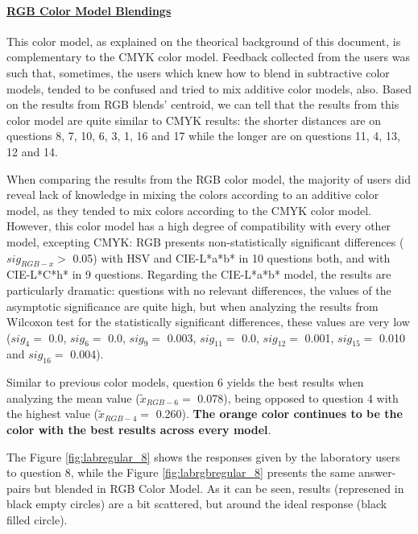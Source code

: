 \paragraph{\ul{RGB Color Model Blendings}} \par
\label{subsubsec:rgbcolormodel}
%
This color model, as explained on the theorical background of this document, is complementary to the CMYK color model. Feedback collected from the users was such that, sometimes, the users which knew how to blend in subtractive color models, tended to be confused and tried to mix additive color models, also.
Based on the results from RGB blends' centroid, we can tell that the results from this color model are quite similar to CMYK results: the shorter distances are on questions 8, 7, 10, 6, 3, 1, 16 and 17 while the longer are on questions 11, 4, 13, 12 and 14. \par
%
When comparing the results from the RGB color model, the majority of users did reveal lack of knowledge in mixing the colors according to an additive color model, as they tended to mix colors according to the CMYK color model. However, this color model has a high degree of compatibility with every other model,
excepting CMYK: RGB presents non-statistically significant differences ($sig_{RGB-x} > $ 0.05) with HSV and CIE-L*a*b* in 10 questions both, and with CIE-L*C*h* in 9 questions. Regarding the CIE-L*a*b* model, the results are particularly dramatic: questions with no relevant differences, the values of the
asymptotic significance are quite high, but when analyzing the results from Wilcoxon test for the statistically significant differences, these values are very low ($sig_{4} = $ 0.0, $sig_{6} = $ 0.0, $sig_{9} = $ 0.003, $sig_{11} = $ 0.0, $sig_{12} = $ 0.001, $sig_{15} = $ 0.010 and $sig_{16} = $ 0.004). \par
%
Similar to previous color models, question 6 yields the best results when analyzing the mean value ($\tilde{x}_{RGB-6} = $ 0.078), being opposed to question 4 with the highest value ($\tilde{x}_{RGB-4} = $ 0.260). \textbf{The orange color continues to be the color with the best results across every model}. \par
%
The Figure \ref{fig:labregular_8} shows the responses given by the laboratory users to question 8, while the Figure \ref{fig:labrgbregular_8} presents the same answer-pairs but blended in RGB Color Model. As it can be seen, results (represened in black empty circles) are a bit scattered, but around the ideal response
(black filled circle). \par
